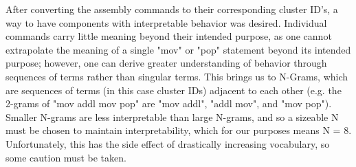 After converting the assembly commands to their corresponding cluster ID's, a way to have components with interpretable behavior was desired. Individual commands carry little meaning beyond their intended purpose, as one cannot extrapolate the meaning of a single "mov" or "pop" statement beyond its intended purpose; however, one can derive greater understanding of behavior through sequences of terms rather than singular terms. This brings us to N-Grams, which are sequences of terms (in this case cluster IDs) adjacent to each other (e.g. the 2-grams of "mov addl mov pop" are "mov addl", "addl mov", and "mov pop"). Smaller N-grams are less interpretable than large N-grams, and so a sizeable N must be chosen to maintain interpretability, which for our purposes means N = 8. Unfortunately, this has the side effect of drastically increasing vocabulary, so some caution must be taken.